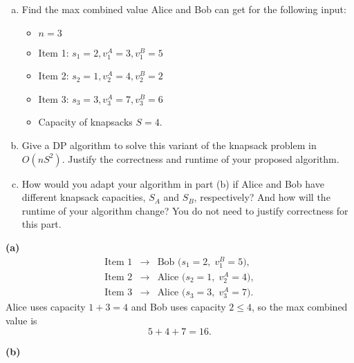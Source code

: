 \documentclass[11pt]{article}
\begin{document}
\begin{tcolorbox}[title={Problem 1 (Knapsack, Take II, 50 pts)}]
        \begin{enumerate}[(a)]
            \item Find the max combined value Alice and Bob can get for the following input:
            \begin{itemize}
                \item \( n = 3 \)
                \item Item 1: \( s_1 = 2, v_1^A = 3, v_1^B = 5 \)
                \item Item 2: \( s_2 = 1, v_2^A = 4, v_2^B = 2 \)
                \item Item 3: \( s_3 = 3, v_3^A = 7, v_3^B = 6 \)
                \item Capacity of knapsacks \(S = 4\).
            \end{itemize} 
            \item Give a DP algorithm to solve this variant of the knapsack problem in $O(nS^2)$. Justify the correctness and runtime of your proposed algorithm. 
            \item How would you adapt your algorithm in part (b) if Alice and Bob have different knapsack capacities, \(S_A\) and \(S_B\), respectively? And how will the runtime of your algorithm change? You do not need to justify correctness for this part.
        \end{enumerate}
    \end{tcolorbox}

    \textbf{(a)}
    \[
    \begin{array}{rcl}
    \text{Item 1} &\to& \text{Bob (} s_1=2,\; v_1^B=5\text{)},\\[1mm]
    \text{Item 2} &\to& \text{Alice (} s_2=1,\; v_2^A=4\text{)},\\[1mm]
    \text{Item 3} &\to& \text{Alice (} s_3=3,\; v_3^A=7\text{)}.
    \end{array}
    \]
    Alice uses capacity \(1+3=4\) and Bob uses capacity \(2\le 4\), so the max combined value is 
    \[
    5+4+7=\boxed{16}.
    \]
    
    \medskip
    
    \textbf{(b)}
    
\end{document}
